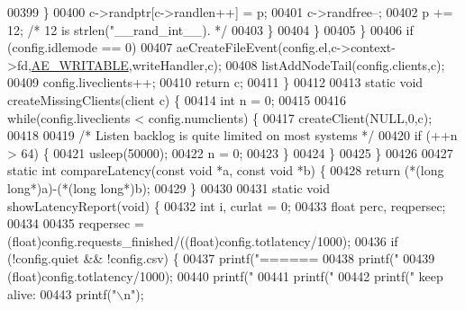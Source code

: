 \begin{DoxyCode}
{{{{{{{{00399                 \}
00400                 c->randptr[c->randlen++] = p;
00401                 c->randfree--;
00402                 p += 12; \textcolor{comment}{/* 12 is strlen("\_\_rand\_int\_\_). */}
00403             \}
00404         \}
00405     \}
00406     \textcolor{keywordflow}{if} (config.idlemode == 0)
00407         aeCreateFileEvent(config.el,c->context->fd,\hyperlink{ae_8h_ab6bfb0366ccb6277112d132c2a2bf500}{AE\_WRITABLE},writeHandler,c);
00408     listAddNodeTail(config.clients,c);
00409     config.liveclients++;
00410     \textcolor{keywordflow}{return} c;
00411 \}
00412 
00413 \textcolor{keyword}{static} \textcolor{keywordtype}{void} createMissingClients(client c) \{
00414     \textcolor{keywordtype}{int} n = 0;
00415 
00416     \textcolor{keywordflow}{while}(config.liveclients < config.numclients) \{
00417         createClient(NULL,0,c);
00418 
00419         \textcolor{comment}{/* Listen backlog is quite limited on most systems */}
00420         \textcolor{keywordflow}{if} (++n > 64) \{
00421             usleep(50000);
00422             n = 0;
00423         \}
00424     \}
00425 \}
00426 
00427 \textcolor{keyword}{static} \textcolor{keywordtype}{int} compareLatency(\textcolor{keyword}{const} \textcolor{keywordtype}{void} *a, \textcolor{keyword}{const} \textcolor{keywordtype}{void} *b) \{
00428     \textcolor{keywordflow}{return} (*(\textcolor{keywordtype}{long} \textcolor{keywordtype}{long}*)a)-(*(\textcolor{keywordtype}{long} \textcolor{keywordtype}{long}*)b);
00429 \}
00430 
00431 \textcolor{keyword}{static} \textcolor{keywordtype}{void} showLatencyReport(\textcolor{keywordtype}{void}) \{
00432     \textcolor{keywordtype}{int} i, curlat = 0;
00433     \textcolor{keywordtype}{float} perc, reqpersec;
00434 
00435     reqpersec = (\textcolor{keywordtype}{float})config.requests\_finished/((\textcolor{keywordtype}{float})config.totlatency/1000);
00436     \textcolor{keywordflow}{if} (!config.quiet && !config.csv) \{
00437         printf(\textcolor{stringliteral}{"====== %
00438         printf(\textcolor{stringliteral}{"  %
00439             (\textcolor{keywordtype}{float})config.totlatency/1000);
00440         printf(\textcolor{stringliteral}{"  %
00441         printf(\textcolor{stringliteral}{"  %
00442         printf(\textcolor{stringliteral}{"  keep alive: %
00443         printf(\textcolor{stringliteral}{"\(\backslash\)n"});
}}}}}}}}}}}}}
\end{DoxyCode}
